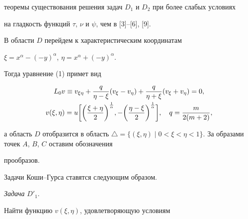 теоремы существования решения задач $D_1$ и $D_2$ при более слабых условиях


на гладкость функций $\tau$, $\nu$ и $\psi$, чем в [3]--[6], [9].





В области $D$ перейдем к характеристическим координатам


$\xi=x^\alpha -(-y)^\alpha$, $\eta= x^\alpha+(-y)^\alpha$.


Тогда уравнение (1) примет вид


\begin{gather}


L_0 v\equiv v_{\xi\eta}+\frac{q}{\eta -\xi} (v_\xi-v_\eta )+


\frac{q}{\eta+\xi}(v_\xi+v_\eta)=0,\\


%


v(\xi,\eta)=u\bigg[


\bigg(\frac{\xi+\eta}{2}\bigg)^{\frac{1}{\alpha}},


-\bigg(\frac{\eta-\xi}{2}\bigg)^{\frac{1}{\alpha}}  \bigg],


\quad q=\frac{m}{2(m+2)},\notag


\end{gather}


а область $D$ отобразится в область $\triangle=\{ (\xi,\eta)\mid


0<\xi<\eta<1\}$. За образами точек $A$, $B$, $C$ оставим обозначения 


прообразов.


Задачи Коши--Гурса ставятся следующим образом.


\medskip





{\it Задача} $D'_1$.


Найти функцию $v(\xi,\eta)$, удовлетворяющую условиям


